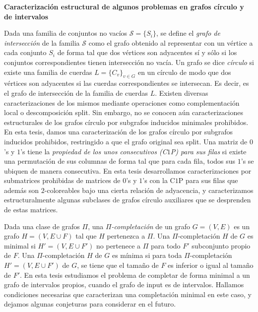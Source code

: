 \documentclass[12pt]{book}
\theoremstyle{plain}
\theoremstyle{remark}
\newenvironment{abstract}%
{\clearpage\null \vfill\begin{center}%
\bfseries \abstractname \end{center}}%
{\vfill\null}
\begin{document}

%
\begin{abstract}

\begin{center}
\textbf{Caracterización estructural de algunos problemas en grafos círculo y de intervalos}
\end{center}

Dada una familia de conjuntos no vacíos $\mathcal{S} = \{S_i\}$, se define el \emph{grafo de intersección} de la familia $\mathcal{S}$ como el grafo obtenido al representar con un vértice a cada conjunto $S_i$ de forma tal que dos vértices son adyacentes sí y sólo si los conjuntos correspondientes tienen intersección no vacía. Un grafo se dice \emph{círculo} si existe una familia de cuerdas $L= \{ C_v \}_{v\in G}$ en un círculo de modo que dos vértices son adyacentes si las cuerdas correspondientes se intersecan. Es decir, es el grafo de intersección de la familia de cuerdas $L$.
Existen diversas caracterizaciones de los mismos mediante operaciones como complementación local o descomposición split. Sin embargo, no se conocen aún caracterizaciones estructurales de los grafos círculo por subgrafos inducidos minimales prohibidos. En esta tesis, damos una caracterización de los grafos círculo por subgrafos inducidos prohibidos, restringido a que el grafo original sea split. %
Una matriz de $0$'s y $1$'s tiene la \emph{propiedad de los unos consecutivos (C$1$P) para sus filas} si existe una permutación de sus columnas de forma tal que para cada fila, todos sus $1$'s se ubiquen de manera consecutiva.
En esta tesis desarrollamos caracterizaciones por submatrices prohibidas de matrices de $0$'s y $1$'s con la C$1$P para sus filas que además son $2$-coloreables bajo una cierta relación de adyacencia, y caracterizamos estructuralmente algunas subclases de grafos círculo auxiliares que se desprenden de estas matrices.


Dada una clase de grafos $\Pi$, una \emph{$\Pi$-completación }de un grafo $G = (V,E)$ es un grafo $H = (V, E \cup F)$ tal que $H$ pertenezca a $\Pi$. 
Una $\Pi$-completación $H$ de $G$ es minimal si $H'= (V, E \cup F')$ no pertenece a $\Pi$ para todo $F'$ subconjunto propio de $F$. 
Una $\Pi$-completación $H$ de $G$ es mínima si para toda $\Pi$-completación $H' = (V, E \cup F')$  de $G$, se tiene que el tamaño de $F$ es inferior o igual al tamaño de $F'$. 
En esta tesis estudiamos el problema de completar de forma minimal a un grafo de intervalos propios, cuando el grafo de input es de intervalos. Hallamos condiciones necesarias que caracterizan una completación minimal en este caso, y dejamos algunas conjeturas para considerar en el futuro. 


\end{abstract}
\end{document}
